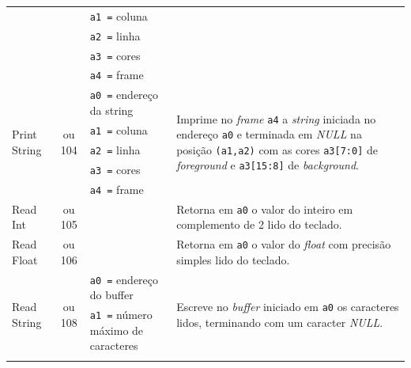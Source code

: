 \begin{longtable}{|l|c|p{3cm}|l |}
            & & \texttt{a1 =} coluna      & \\*
            & & \texttt{a2 =} linha       & \\*
            & & \texttt{a3 =} cores       & \\*
            & & \texttt{a4 =} frame       & \\
        \hline
        \multirow{5}{*}{Print String}       & \multirow{5}{*}{\parbox{0.6cm}{ ou 104}}
              & \texttt{a0 =} endereço da string  & \multirow{5}{*}{\parbox{7cm}{Imprime no \textit{frame} \texttt{a4} a \textit{string} iniciada no endereço \texttt{a0} e terminada
                                                        em \textit{NULL} na posição \texttt{(a1,a2)} com as cores \texttt{a3[7:0]} de \textit{foreground} e \texttt{a3[15:8]} de \textit{background}.}}\\*
            & & \texttt{a1 =} coluna      & \\*
            & & \texttt{a2 =} linha       & \\*
            & & \texttt{a3 =} cores       & \\*
            & & \texttt{a4 =} frame       & \\
        \hline
        \multirow{3}{*}{Read Int}           & \multirow{3}{*}{\parbox{0.6cm}{ ou 105}}
            &                               & \multirow{3}{*}{\parbox{7cm}{Retorna em \texttt{a0} o valor do inteiro em complemento de 2 lido do teclado.}}\\*
            & & & \\*
            & & & \\
        \hline
        \multirow{3}{*}{Read Float}         & \multirow{3}{*}{\parbox{0.6cm}{ ou 106}}
            &                               & \multirow{3}{*}{\parbox{7cm}{Retorna em \texttt{a0} o valor do \textit{float} com precisão simples lido do teclado.}}\\*
            & & & \\*
            & & & \\
        \hline
        \multirow{3}{*}{Read String}        & \multirow{3}{*}{\parbox{0.6cm}{ ou 108}}
            & \texttt{a0 =} endereço do buffer    & \multirow{3}{*}{\parbox{7cm}{Escreve no \textit{buffer} iniciado em \texttt{a0} os caracteres lidos, terminando com um caracter \textit{NULL}.}}\\*
            & & \texttt{a1 =} número máximo de caracteres & \\*
            & & & \\

\end{longtable}
